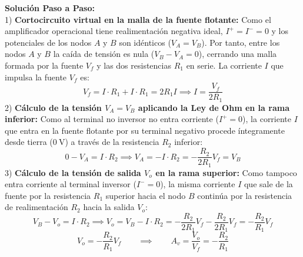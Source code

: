 \begin{ejercicio}
\textbf{Solución Paso a Paso:}\\[4pt]
1) \textbf{Cortocircuito virtual en la malla de la fuente flotante:}
Como el amplificador operacional tiene realimentación negativa ideal, $I^+ = I^- = 0$ y los potenciales de los nodos $A$ y $B$ son idénticos ($V_A = V_B$).
Por tanto, entre los nodos $A$ y $B$ la caída de tensión es nula ($V_B - V_A = 0$), cerrando una malla formada por la fuente $V_f$ y las dos resistencias $R_1$ en serie. La corriente $I$ que impulsa la fuente $V_f$ es:
\begin{equation}
    V_f = I \cdot R_1 + I \cdot R_1 = 2 R_1 I \implies I = \frac{V_f}{2 R_1}
\end{equation}
2) \textbf{Cálculo de la tensión $V_A = V_B$ aplicando la Ley de Ohm en la rama inferior:}
Como al terminal no inversor no entra corriente ($I^+ = 0$), la corriente $I$ que entra en la fuente flotante por su terminal negativo procede íntegramente desde tierra ($0\ \si{\volt}$) a través de la resistencia $R_2$ inferior:
\begin{equation}
    0 - V_A = I \cdot R_2 \implies V_A = -I \cdot R_2 = -\frac{R_2}{2 R_1} V_f = V_B
\end{equation}
3) \textbf{Cálculo de la tensión de salida $V_o$ en la rama superior:}
Como tampoco entra corriente al terminal inversor ($I^- = 0$), la misma corriente $I$ que sale de la fuente por la resistencia $R_1$ superior hacia el nodo $B$ continúa por la resistencia de realimentación $R_2$ hacia la salida $V_o$:
\begin{equation}
    V_B - V_o = I \cdot R_2 \implies V_o = V_B - I \cdot R_2 = -\frac{R_2}{2 R_1} V_f - \frac{R_2}{2 R_1} V_f = -\frac{R_2}{R_1} V_f
\end{equation}
\begin{equation}
    \boxed{V_o = -\frac{R_2}{R_1} V_f \qquad \implies \qquad A_v = \frac{V_o}{V_f} = -\frac{R_2}{R_1}}
\end{equation}
\end{ejercicio}

